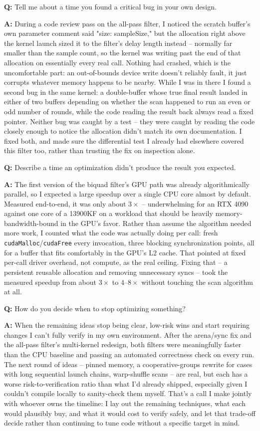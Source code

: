 \documentclass[11pt]{article}
\newcommand{\Q}[1]{\vspace{0.6em}\noindent\textbf{\textcolor{blue!60!black}{Q:}} #1\par}
\newcommand{\A}[1]{\noindent\textbf{A:} #1\par}
\begin{document}
\Q{Tell me about a time you found a critical bug in your own design.}
\A{During a code review pass on the all-pass filter, I noticed the scratch buffer's own parameter comment said "size: sampleSize," but the allocation right above the kernel launch sized it to the filter's delay length instead -- normally far smaller than the sample count, so the kernel was writing past the end of that allocation on essentially every real call. Nothing had crashed, which is the uncomfortable part: an out-of-bounds device write doesn't reliably fault, it just corrupts whatever memory happens to be nearby. While I was in there I found a second bug in the same kernel: a double-buffer whose true final result landed in either of two buffers depending on whether the scan happened to run an even or odd number of rounds, while the code reading the result back always read a fixed pointer. Neither bug was caught by a test -- they were caught by reading the code closely enough to notice the allocation didn't match its own documentation. I fixed both, and made sure the differential test I already had elsewhere covered this filter too, rather than trusting the fix on inspection alone.}

\Q{Describe a time an optimization didn't produce the result you expected.}
\A{The first version of the biquad filter's GPU path was already algorithmically parallel, so I expected a large speedup over a single CPU core almost by default. Measured end-to-end, it was only about $3\times$ -- underwhelming for an RTX 4090 against one core of a 13900KF on a workload that should be heavily memory-bandwidth-bound in the GPU's favor. Rather than assume the algorithm needed more work, I counted what the code was actually doing per call: fresh \texttt{cudaMalloc}/\texttt{cudaFree} every invocation, three blocking synchronization points, all for a buffer that fits comfortably in the GPU's L2 cache. That pointed at fixed per-call driver overhead, not compute, as the real ceiling. Fixing that -- a persistent reusable allocation and removing unnecessary syncs -- took the measured speedup from about $3\times$ to $4$--$8\times$ without touching the scan algorithm at all.}

\Q{How do you decide when to stop optimizing something?}
\A{When the remaining ideas stop being clear, low-risk wins and start requiring changes I can't fully verify in my own environment. After the arena/sync fix and the all-pass filter's multi-kernel redesign, both filters were meaningfully faster than the CPU baseline and passing an automated correctness check on every run. The next round of ideas -- pinned memory, a cooperative-groups rewrite for cases with long sequential launch chains, warp-shuffle scans -- are real, but each has a worse risk-to-verification ratio than what I'd already shipped, especially given I couldn't compile locally to sanity-check them myself. That's a call I make jointly with whoever owns the timeline: I lay out the remaining techniques, what each would plausibly buy, and what it would cost to verify safely, and let that trade-off decide rather than continuing to tune code without a specific target in mind.}
\end{document}
